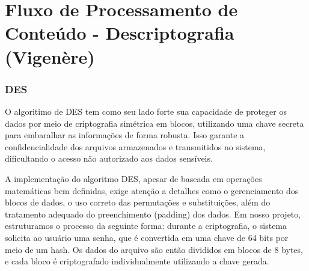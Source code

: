 \documentclass[12pt]{article}
\begin{document}
\section*{Fluxo de Processamento de Conteúdo - Descriptografia (Vigenère)} 
\begin{center} 
\end{center}

\subsubsection{DES}
O algoritimo de DES tem como seu lado forte sua capacidade de proteger os dados por meio de criptografia simétrica em blocos, utilizando uma chave secreta para embaralhar as informações de forma robusta. Isso garante a confidencialidade dos arquivos armazenados e transmitidos no sistema, dificultando o acesso não autorizado aos dados sensíveis.

A implementação do algoritmo DES, apesar de baseada em operações matemáticas bem definidas, exige atenção a detalhes como o gerenciamento dos blocos de dados, o uso correto das permutações e substituições, além do tratamento adequado do preenchimento (padding) dos dados. Em nosso projeto, estruturamos o processo da seguinte forma: durante a criptografia, o sistema solicita ao usuário uma senha, que é convertida em uma chave de 64 bits por meio de um hash. Os dados do arquivo são então divididos em blocos de 8 bytes, e cada bloco é criptografado individualmente utilizando a chave gerada.
\end{document}
